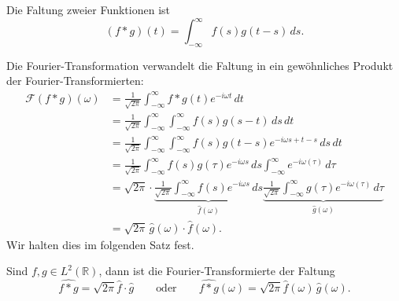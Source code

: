 \begin{definition}
\label{definition:faltung}
Die Faltung zweier Funktionen ist
\begin{equation}
(f*g)(t)
=
\int_{-\infty}^\infty f(s)g(t-s)\,ds.
\label{definition:formel:faltung}
\end{equation}
\end{definition}
Die Fourier-Transformation verwandelt die Faltung in ein gewöhnliches
Produkt der Fourier-Transformierten:
\begin{align*}
\mathcal{F}(f*g)(\omega)
&=
\frac{1}{\sqrt{2\pi}}
\int_{-\infty}^\infty
f*g(t)
e^{-i\omega t}
\,dt
\\
&=
\frac{1}{\sqrt{2\pi}}
\int_{-\infty}^\infty
\int_{-\infty}^\infty
f(s) g(s-t)
\,ds
\,dt
\\
&=
\frac{1}{\sqrt{2\pi}}
\int_{-\infty}^\infty
\int_{-\infty}^\infty
f(s) g(t-s)
e^{-i\omega s+t-s}
\,ds
\,dt
\\
&=
\frac{1}{\sqrt{2\pi}}
\int_{-\infty}^\infty
f(s) g(\tau)
e^{-i\omega s}
\,ds
\int_{-\infty}^\infty
e^{-i\omega (\tau)}
\,d\tau
\\
&=
\sqrt{2\pi}
\cdot
\underbrace{
\frac{1}{\sqrt{2\pi}}
\int_{-\infty}^\infty
f(s)
e^{-i\omega s}
\,ds}_{\displaystyle \hat{f}(\omega)}
\underbrace{
\frac{1}{\sqrt{2\pi}}
\int_{-\infty}^\infty
g(\tau)
e^{-i\omega (\tau)}
\,d\tau}_{\displaystyle \hat{g}(\omega)}
\\
&=
\sqrt{2\pi}\,
\hat{g}(\omega)\cdot \hat{f}(\omega).
\end{align*}
Wir halten dies im folgenden Satz fest.

\begin{satz}[Faltungsformel]
\label{satz:faltungsformel}
Sind $f,g\in L^2(\mathbb R)$, dann ist die Fourier-Transformierte
der Faltung
\begin{equation}
\widehat{f*g}
=
\sqrt{2\pi}
\hat{f}\cdot \hat{g}
\qquad\text{oder}\qquad
\widehat{f*g}(\omega)
=
\sqrt{2\pi}
\hat{f}(\omega)\, \hat{g}(\omega).
\label{ft:faltungsformel}
\end{equation}
\end{satz}

